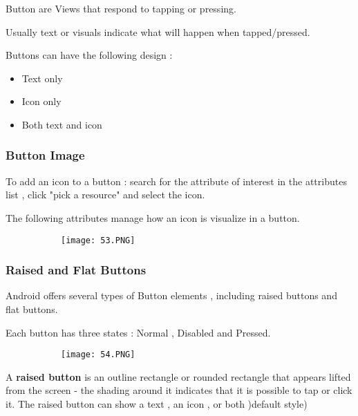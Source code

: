 \documentclass{article}
\begin{document}
Button are Views that respond to tapping or pressing.

Usually text or visuals indicate what will happen when tapped/pressed.

Buttons can have the following design : 

\begin{itemize}
    \item Text only
    \item Icon only
    \item Both text and icon
\end{itemize}

\subsubsection{Button Image}

To add an icon to a button : search for the attribute of interest in the attributes list , click "pick a resource" and select the icon.

The following attributes manage how an icon is visualize in a button.

  \begin{figure}[ht!]
  \centering
  \begin{subfigure}[b]{0.8\linewidth}
    \texttt{[image: 53.PNG]}
  \end{subfigure}
  \end{figure}

  \subsubsection{Raised and Flat Buttons}

  Android offers several types of Button elements , including raised buttons and flat buttons.

  Each button has three states : Normal , Disabled and Pressed.
  
  \begin{figure}[ht!]
  \centering
  \begin{subfigure}[b]{0.5\linewidth}
  \texttt{[image: 54.PNG]}
  \end{subfigure}
  \end{figure}

  A \textbf{raised button} is an outline rectangle or rounded rectangle that appears lifted from the screen - the shading around it indicates that it is possible to tap or click it. The raised button can show a text , an icon , or both )default style)
\end{document}

